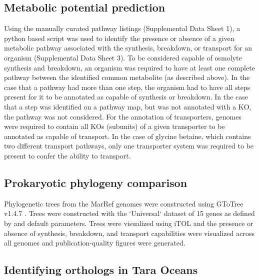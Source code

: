 \documentclass[utf8]{frontiersSCNS} %
\begin{document}
\subsection{Metabolic potential prediction}

Using the manually curated pathway listings (Supplemental Data Sheet 1), a python based script was used to identify the presence or absence of a given metabolic pathway associated with the synthesis, breakdown, or transport for an organism (Supplemental Data Sheet 3). To be considered capable of osmolyte synthesis and breakdown, an organism was required to have at least one complete pathway between the identified common metabolite (as described above). In the case that a pathway had more than one step, the organism had to have all steps present for it to be annotated as capable of synthesis or breakdown. In the case that a step was identified on a pathway map, but was not annotated with a KO, the pathway was not considered. For the annotation of transporters, genomes were required to contain all KOs (subunits) of a given transporter to be annotated as capable of transport. In the case of glycine betaine, which contains two different transport pathways, only one transporter system was required to be present to confer the ability to transport. 

\subsection{Prokaryotic phylogeny comparison}

Phylogenetic trees from the MarRef genomes were constructed using GToTree v1.4.7 \citep{Lee_2019, Price_2010}. Trees were constructed with the `Universal` dataset of 15 genes as defined by \citet{Hug_2016} and default parameters. Trees were visualized using iTOL  \citep{Letunic_2016} and the presence or absence of synthesis, breakdown, and transport capabilities were visualized across all genomes and publication-quality figures were generated. 


\subsection{Identifying orthologs in Tara Oceans}
\end{document}
